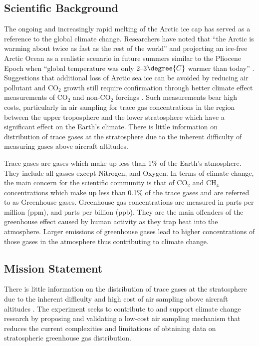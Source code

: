\documentclass[a4paper,12pt,oneside]{article}
\begin{document}
\subsection{Scientific Background}

The ongoing and increasingly rapid melting of the Arctic ice cap has served as a reference to the global climate change. Researchers have noted that \enquote{the Arctic is warming about twice as fast as the rest of the world} \cite{Perkins} and projecting an ice-free Arctic Ocean as a realistic scenario in future summers similar to the Pliocene Epoch when \enquote{global temperature was only 2–3$\degree{C}$ warmer than today} \cite{Trace}. Suggestions that additional loss of Arctic sea ice can be avoided by reducing air pollutant and CO$_{2}$ growth still require confirmation through better climate effect measurements of CO$_{2}$ and non-CO$_{2}$ forcings \cite{Trace}. Such measurements bear high costs, particularly in air sampling for trace gas concentrations in the region between the upper troposphere and the lower stratosphere which have a significant effect on the Earth's climate. There is little information on distribution of trace gases at the stratosphere due to the inherent difficulty of measuring gases above aircraft altitudes.

Trace gases are gases which make up less than 1\% of the Earth's atmosphere. They include all gasses except Nitrogen, and Oxygen. In terms of climate change, the main concern for the scientific community is that of CO$_2$ and CH$_4$ concentrations which make up less than 0.1\% of the trace gases and are referred to as Greenhouse gases. Greenhouse gas concentrations are measured in parts per million (ppm), and parts per billion (ppb). They are the main offenders of the greenhouse effect caused by human activity as they trap heat into the atmosphere. Larger emissions of greenhouse gases lead to higher concentrations of those gases in the atmosphere thus contributing to climate change.

\subsection{Mission Statement}

There is little information on the distribution of trace gases at the stratosphere due to the inherent difficulty and high cost of air sampling above aircraft altitudes \cite{Trace}. The experiment seeks to contribute to and support climate change research by proposing and validating a low-cost air sampling mechanism that reduces the current complexities and limitations of obtaining data on stratospheric greenhouse gas distribution.
\pagebreak
\end{document}
